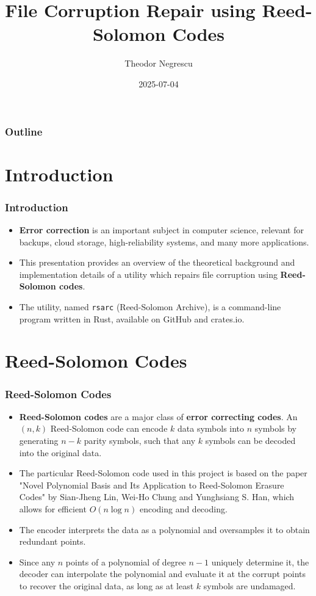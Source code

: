 \documentclass{beamer}
\title{File Corruption Repair using Reed-Solomon Codes}
\author{Theodor Negrescu}
\date{2025-07-04}
\begin{document}
\frame{\titlepage}

\begin{frame}
\frametitle{Outline}
\tableofcontents
\end{frame}

\section{Introduction}
\begin{frame}
\frametitle{Introduction}
\begin{itemize}
\item
\textbf{Error correction} is an important subject in computer science, relevant for backups, cloud storage, high-reliability systems, and many more applications.
\item
This presentation provides an overview of the theoretical background and implementation details of a utility which repairs file corruption using \textbf{Reed-Solomon codes}.
\item
The utility, named \texttt{rsarc} (Reed-Solomon Archive), is a command-line program written in Rust, available on GitHub and crates.io.
\end{itemize}
\end{frame}

\section{Reed-Solomon Codes}
\begin{frame}
\frametitle{Reed-Solomon Codes}
\begin{itemize}

\item
\textbf{Reed-Solomon codes} are a major class of \textbf{error correcting codes}.
An $(n, k)$ Reed-Solomon code can encode $k$ data symbols into $n$ symbols by generating $n-k$ parity symbols, such that any $k$ symbols can be decoded into the original data.

\item
The particular Reed-Solomon code used in this project is based on the paper "Novel Polynomial Basis and Its Application to Reed-Solomon Erasure Codes" by Sian-Jheng Lin, Wei-Ho Chung and Yunghsiang S. Han,
which allows for efficient $O(n \log n)$ encoding and decoding.

\item
The encoder interprets the data as a polynomial and oversamples it to obtain redundant points.

\item
Since any $n$ points of a polynomial of degree $n-1$ uniquely determine it, the decoder can interpolate the polynomial and evaluate it at the corrupt points to recover the original data,
as long as at least $k$ symbols are undamaged.

\end{itemize}
\end{frame}
\end{document}
